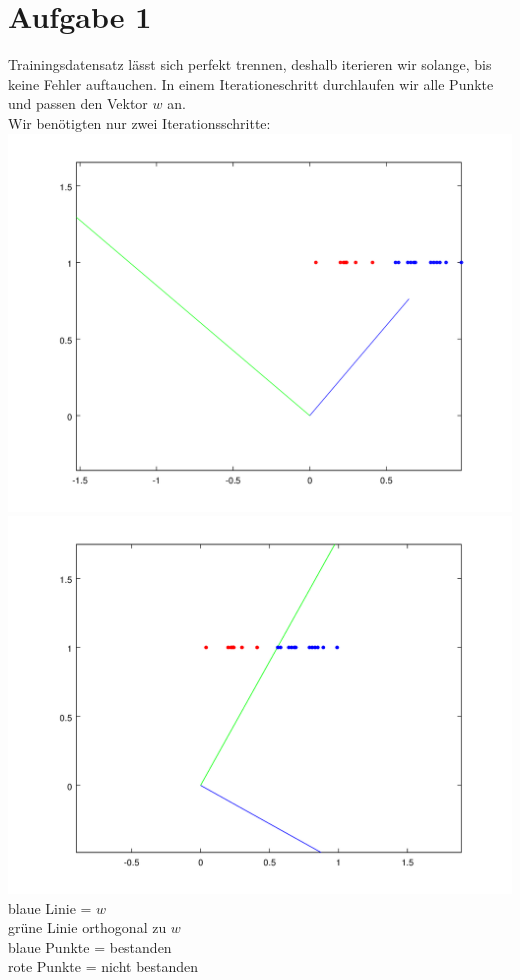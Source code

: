 \documentclass[a4paper,10pt]{article}
\begin{document}
\section*{Aufgabe 1}
	Trainingsdatensatz lässt sich perfekt trennen,
	deshalb iterieren wir solange, bis keine Fehler auftauchen.
	In einem Iterationeschritt durchlaufen wir alle Punkte und passen
	den Vektor $w$ an.\\
	Wir benötigten nur zwei Iterationsschritte:\\
	\includegraphics[scale=0.6]{aufg1_iteration1}\\
	\includegraphics[scale=0.6]{aufg1_iteration2}\\
	blaue Linie = $w$\\
	grüne Linie orthogonal zu $w$\\
	blaue Punkte = bestanden\\
	rote Punkte = nicht bestanden\\
\end{document}
